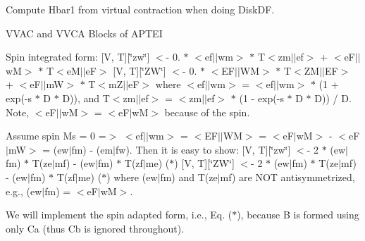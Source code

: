 Compute Hbar1 from virtual contraction when doing Disk\+DF. 

V\+V\+AC and V\+V\+CA Blocks of A\+P\+T\+EI

Spin integrated form\+: \mbox{[}V, T\mbox{]}\mbox{[}\char`\"{}zw\char`\"{}\mbox{]} $<$-\/ 0. $\ast$ $<$ef$\vert$$\vert$wm$>$\textquotesingle{} $\ast$ T$<$zm$\vert$$\vert$ef$>$ + $<$e\+F$\vert$$\vert$wM$>$\textquotesingle{} $\ast$ T$<$e\+M$\vert$$\vert$eF$>$ \mbox{[}V, T\mbox{]}\mbox{[}\char`\"{}\+Z\+W\char`\"{}\mbox{]} $<$-\/ 0. $\ast$ $<$E\+F$\vert$$\vert$\+WM$>$\textquotesingle{} $\ast$ T$<$Z\+M$\vert$$\vert$\+EF$>$ + $<$e\+F$\vert$$\vert$mW$>$\textquotesingle{} $\ast$ T$<$m\+Z$\vert$$\vert$eF$>$ where $<$ef$\vert$$\vert$wm$>$\textquotesingle{} = $<$ef$\vert$$\vert$wm$>$ $\ast$ (1 + exp(-\/s $\ast$ D $\ast$ D)), and T$<$zm$\vert$$\vert$ef$>$ = $<$zm$\vert$$\vert$ef$>$ $\ast$ (1 -\/ exp(-\/s $\ast$ D $\ast$ D)) / D. Note, $<$e\+F$\vert$$\vert$wM$>$\textquotesingle{} = $<$e\+F$\vert$wM$>$\textquotesingle{} because of the spin.

Assume spin Ms = 0 =$>$ $<$ef$\vert$$\vert$wm$>$ = $<$E\+F$\vert$$\vert$\+WM$>$ = $<$e\+F$\vert$wM$>$ -\/ $<$e\+F$\vert$mW$>$ = (ew$\vert$fm) -\/ (em$\vert$fw). Then it is easy to show\+: \mbox{[}V, T\mbox{]}\mbox{[}\char`\"{}zw\char`\"{}\mbox{]} $<$-\/ 2 $\ast$ (ew$\vert$fm)\textquotesingle{}\textquotesingle{} $\ast$ T(ze$\vert$mf)\textquotesingle{}\textquotesingle{} -\/ (ew$\vert$fm)\textquotesingle{}\textquotesingle{} $\ast$ T(zf$\vert$me)\textquotesingle{}\textquotesingle{} ($\ast$) \mbox{[}V, T\mbox{]}\mbox{[}\char`\"{}\+Z\+W\char`\"{}\mbox{]} $<$-\/ 2 $\ast$ (ew$\vert$fm)\textquotesingle{}\textquotesingle{} $\ast$ T(ze$\vert$mf)\textquotesingle{}\textquotesingle{} -\/ (ew$\vert$fm)\textquotesingle{}\textquotesingle{} $\ast$ T(zf$\vert$me)\textquotesingle{}\textquotesingle{} ($\ast$) where (ew$\vert$fm)\textquotesingle{}\textquotesingle{} and T(ze$\vert$mf)\textquotesingle{}\textquotesingle{} are N\+OT antisymmetrized, e.\+g., (ew$\vert$fm)\textquotesingle{}\textquotesingle{} = $<$e\+F$\vert$wM$>$\textquotesingle{}.

We will implement the spin adapted form, i.\+e., Eq. ($\ast$), because B is formed using only Ca (thus Cb is ignored throughout).


